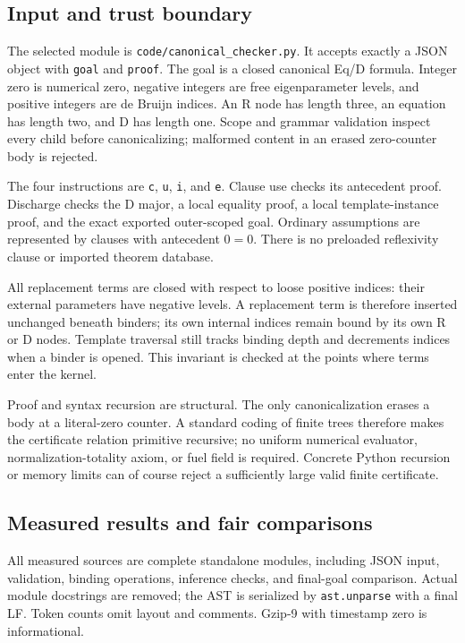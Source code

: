 \documentclass[11pt]{article}
\theoremstyle{definition}\newtheorem{definition}[theorem]{Definition}
\begin{document}
\subsection{Input and trust boundary}

The selected module is \texttt{code/canonical\_checker.py}. It accepts
exactly a JSON object with \texttt{goal} and \texttt{proof}. The goal
is a closed canonical Eq/D formula. Integer zero is numerical zero,
negative integers are free eigenparameter levels, and positive integers
are de Bruijn indices. An R node has length three, an equation has
length two, and D has length one. Scope and grammar validation inspect
every child before canonicalizing; malformed content in an erased
zero-counter body is rejected.

The four instructions are \texttt{c}, \texttt{u}, \texttt{i}, and
\texttt{e}. Clause use checks its antecedent proof. Discharge checks
the D major, a local equality proof, a local template-instance proof,
and the exact exported outer-scoped goal. Ordinary assumptions are
represented by clauses with antecedent $0=0$. There is no preloaded
reflexivity clause or imported theorem database.

All replacement terms are closed with respect to loose positive
indices: their external parameters have negative levels. A replacement
term is therefore inserted unchanged beneath binders; its own internal
indices remain bound by its own R or D nodes. Template traversal still
tracks binding depth and decrements indices when a binder is opened.
This invariant is checked at the points where terms enter the kernel.

Proof and syntax recursion are structural. The only canonicalization
erases a body at a literal-zero counter. A standard coding of finite
trees therefore makes the certificate relation primitive recursive;
no uniform numerical evaluator, normalization-totality axiom, or fuel
field is required. Concrete Python recursion or memory limits can of
course reject a sufficiently large valid finite certificate.

\subsection{Measured results and fair comparisons}

All measured sources are complete standalone modules, including JSON
input, validation, binding operations, inference checks, and final-goal
comparison. Actual module docstrings are removed; the AST is serialized
by \texttt{ast.unparse} with a final LF. Token counts omit layout and
comments. Gzip-9 with timestamp zero is informational.
\end{document}
